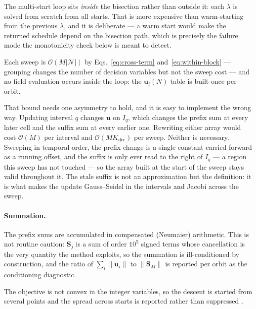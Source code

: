 The multi-start loop sits \emph{inside} the bisection rather than outside it:
each $\lambda$ is solved from scratch from all starts. That is more expensive
than warm-starting from the previous $\lambda$, and it is deliberate --- a
warm start would make the returned schedule depend on the bisection path, which
is precisely the failure mode the monotonicity check below is meant to detect.

Each sweep is $\mathcal{O}(M\lvert\mathcal{N}\rvert)$ by
Eqs.~\eqref{eq:cross-term} and~\eqref{eq:within-block} --- grouping changes the
number of decision variables but not the sweep cost --- and no field evaluation
occurs inside the loop: the $\mathbf u_i(N)$ table is built once per orbit.

That bound needs one asymmetry to hold, and it is easy to implement the wrong
way. Updating interval $q$ changes $\mathbf u$ on $I_q$, which changes the
prefix sum at every later cell and the suffix sum at every earlier one.
Rewriting either array would cost $\mathcal{O}(M)$ per interval and
$\mathcal{O}(MK_{\mathrm{dec}})$ per sweep. Neither is necessary. Sweeping in
temporal order, the prefix change is a single constant carried forward as a
running offset, and the suffix is only ever read to the right of $I_q$ --- a
region this sweep has not touched --- so the array built at the start of the
sweep stays valid throughout it. The stale suffix is not an approximation but
the definition: it is what makes the update Gauss--Seidel in the intervals and
Jacobi across the sweep.

\paragraph{Summation.} The prefix sums are accumulated in compensated
(Neumaier) arithmetic. This is not routine caution: $\mathbf S_j$ is a sum of
order $10^5$ signed terms whose cancellation is the very quantity the method
exploits, so the summation is ill-conditioned by construction, and the ratio of
$\sum_i\lVert\mathbf u_i\rVert$ to $\lVert\mathbf S_M\rVert$ is reported per
orbit as the conditioning diagnostic. 

The objective is not convex in the integer variables, so the descent is
started from several points and the spread across starts is reported rather
than suppressed .

